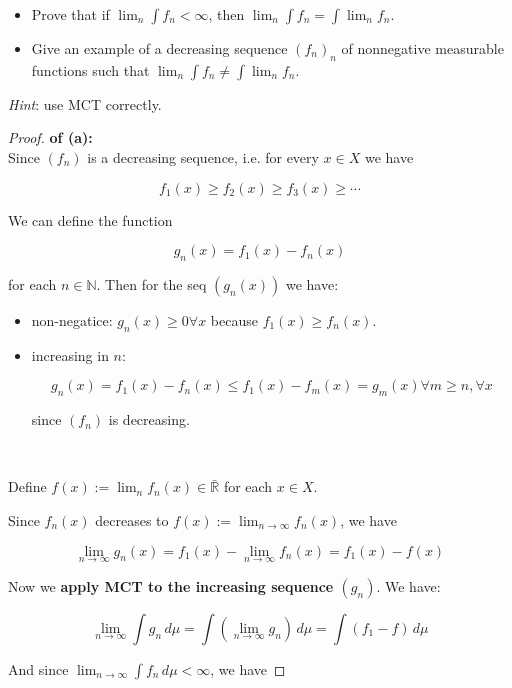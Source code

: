 \documentclass{qlnotes-export}
\begin{document}
\begin{itemize}
\item
  Prove that if \(\lim_{n}\int f_{n} < \infty\), then \(\lim_{n}\int f_{n} = \int\lim_{n}f_{n}\).
\item
  Give an example of a decreasing sequence \((f_{n})_{n}\) of nonnegative measurable functions such that \(\lim_{n}\int f_{n} \neq \int\lim_{n}f_{n}\).
\end{itemize}

\emph{Hint}: use MCT correctly.

\begin{proof}

\textbf{of (a):}\\
Since \((f_{n})\) is a decreasing sequence, i.e. for every \(x \in X\) we have

\[f_{1}(x) \geq f_{2}(x) \geq f_{3}(x) \geq \cdots\]

We can define the function

\[g_{n}(x) = f_{1}(x) - f_{n}(x)\]

for each \(n \in {\mathbb{N}}\). Then for the seq \((g_{n}(x))\) we have:

\begin{itemize}
\item
  non-negatice: \(g_{n}(x) \geq 0\forall x\) because \(f_{1}(x) \geq f_{n}(x)\).
\item
  increasing in \(n\):

  \[g_{n}(x) = f_{1}(x) - f_{n}(x) \leq f_{1}(x) - f_{m}(x) = g_{m}(x)\forall m \geq n,\forall x\]

  since \((f_{n})\) is decreasing.\\
  \strut \\
\end{itemize}

Define \(f(x) := \lim_{n}f_{n}(x) \in \bar{\mathbb{R}}\) for each \(x \in X\).

Since \(f_{n}(x)\) decreases to \(f(x) := \lim_{n\rightarrow\infty}f_{n}(x)\), we have

\[\lim\limits_{n\rightarrow\infty}g_{n}(x) = f_{1}(x) - \lim\limits_{n\rightarrow\infty}f_{n}(x) = f_{1}(x) - f(x)\]

Now we \textbf{apply MCT to the increasing sequence \((g_{n})\)}. We have:

\[\lim\limits_{n\rightarrow\infty}\int g_{n}\, d\mu = \int(\lim\limits_{n\rightarrow\infty}g_{n})\, d\mu = \int(f_{1} - f)\, d\mu\]

And since \(\lim_{n\rightarrow\infty}\int f_{n}\, d\mu < \infty\), we have


\end{proof}
\end{document}
